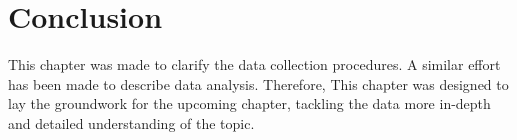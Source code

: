 \section{Conclusion}
This chapter was made to clarify the data collection procedures. A similar effort has been made to
describe data analysis. Therefore, This chapter was designed to lay the groundwork for the upcoming
chapter, tackling the data more in-depth and detailed understanding of the topic.
